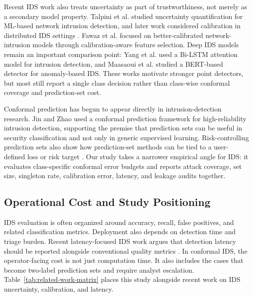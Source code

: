 \documentclass[11pt]{article}
\begin{document}
Recent IDS work also treats uncertainty as part of trustworthiness, not merely as a secondary model property. Talpini et al. \cite{talpini2024trustworthiness} studied uncertainty quantification for ML-based network intrusion detection, and later work considered calibration in distributed IDS settings \cite{talpini2025federated}. Fawaz et al. \cite{fawaz2025calibrated} focused on better-calibrated network-intrusion models through calibration-aware feature selection. Deep IDS models remain an important comparison point: Yang et al. \cite{yang2023bilstmattention} used a Bi-LSTM attention model for intrusion detection, and Maasaoui et al. \cite{maasaoui2024llmids} studied a BERT-based detector for anomaly-based IDS. These works motivate stronger point detectors, but most still report a single class decision rather than class-wise conformal coverage and prediction-set cost.

Conformal prediction has begun to appear directly in intrusion-detection research. Jin and Zhao \cite{jin2022highreliability} used a conformal prediction framework for high-reliability intrusion detection, supporting the premise that prediction sets can be useful in security classification and not only in generic supervised learning. Risk-controlling prediction sets also show how prediction-set methods can be tied to a user-defined loss or risk target \cite{bates2021risk}. Our study takes a narrower empirical angle for IDS: it evaluates class-specific conformal error budgets and reports attack coverage, set size, singleton rate, calibration error, latency, and leakage audits together.

\subsection{Operational Cost and Study Positioning}

IDS evaluation is often organized around accuracy, recall, false positives, and related classification metrics. Deployment also depends on detection time and triage burden. Recent latency-focused IDS work argues that detection latency should be reported alongside conventional quality metrics \cite{puccetti2026latencies,dash2026latency}. In conformal IDS, the operator-facing cost is not just computation time. It also includes the cases that become two-label prediction sets and require analyst escalation. Table~\ref{tab:related-work-matrix} places this study alongside recent work on IDS uncertainty, calibration, and latency.


\end{document}
